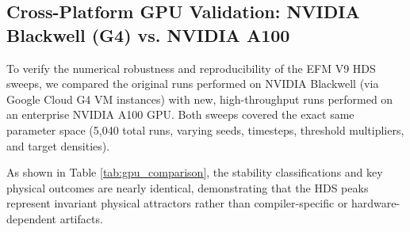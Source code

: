 \documentclass[11pt, twoside]{article}
\begin{document}
\subsection{Cross-Platform GPU Validation: NVIDIA Blackwell (G4) vs. NVIDIA A100}
To verify the numerical robustness and reproducibility of the EFM V9 HDS sweeps, we compared the original runs performed on NVIDIA Blackwell (via Google Cloud G4 VM instances) with new, high-throughput runs performed on an enterprise NVIDIA A100 GPU. Both sweeps covered the exact same parameter space (5,040 total runs, varying seeds, timesteps, threshold multipliers, and target densities).

As shown in Table \ref{tab:gpu_comparison}, the stability classifications and key physical outcomes are nearly identical, demonstrating that the HDS peaks represent invariant physical attractors rather than compiler-specific or hardware-dependent artifacts.

\begin{table}[H]
\centering
\caption{Cross-Platform Sweep Comparison: NVIDIA Blackwell (G4) vs. NVIDIA A100}
\label{tab:gpu_comparison}
\end{table}
\end{document}
